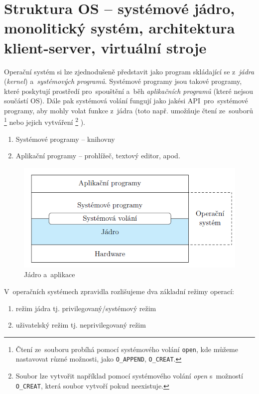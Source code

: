 
\section{Struktura OS -- systémové jádro, monolitický systém, architektura klient-server, virtuální stroje}
\label{kernel}

Operační systém si lze zjednodušeně představit jako program skládající se z~\emph{jádra} (\emph{kernel}) a~\emph{systémových programů}. Systémové programy jsou takové programy, které poskytují prostředí pro~spouštění a~běh \emph{aplikačních programů} (které nejsou součástí OS). Dále pak systémová volání fungují jako jakési API~pro~systémové programy, aby mohly volat funkce z~jádra (toto např. umožňuje čtení ze~souborů%
\footnote{Čtení ze~souboru probíhá pomocí systémového volání \texttt{open}, kde můžeme nastavovat různé možnosti, jako \texttt{O\_APPEND}, \texttt{O\_CREAT}.}%
 nebo jejich vytváření%
 \footnote{Soubor lze vytvořit například pomocí systémového volání \emph{open} s~možností \texttt{O\_CREAT}, která soubor vytvoří pokud neexistuje.}%
 ).

\begin{enumerate}
	\item Systémové programy -- knihovny
	\item Aplikační programy -- prohlížeč, textový editor, apod.
\end{enumerate}

\begin{figure}[ht]
	\centering
	\includegraphics[scale=1]{images/OS_kernel_apps.png}
	\caption{Jádro a~aplikace}
	\label{OS_kernel_apps}
\end{figure}

V~operačních systémech zpravidla rozlišujeme dva základní režimy operací:

\begin{enumerate}
	\item režim jádra tj. privilegovaný/systémový režim
	\item uživatelský režim tj. neprivilegovaný režim
\end{enumerate}

